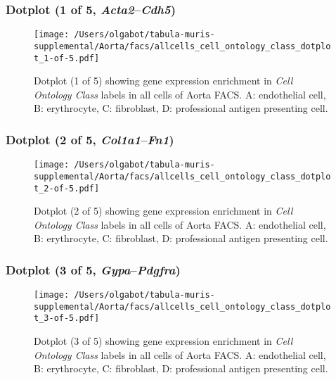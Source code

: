\clearpage

\subsubsection{Dotplot (1 of 5, \emph{Acta2}--\emph{Cdh5})}
\begin{figure}[h]
\centering
\texttt{[image: /Users/olgabot/tabula-muris-supplemental/Aorta/facs/allcells\_cell\_ontology\_class\_dotplot\_1-of-5.pdf]}

\caption{ Dotplot (1 of 5)  showing gene expression enrichment in \emph{Cell Ontology Class} labels in all cells of Aorta FACS. A: endothelial cell, B: erythrocyte, C: fibroblast, D: professional antigen presenting cell.}
\end{figure}


\clearpage

\subsubsection{Dotplot (2 of 5, \emph{Col1a1}--\emph{Fn1})}
\begin{figure}[h]
\centering
\texttt{[image: /Users/olgabot/tabula-muris-supplemental/Aorta/facs/allcells\_cell\_ontology\_class\_dotplot\_2-of-5.pdf]}

\caption{ Dotplot (2 of 5)  showing gene expression enrichment in \emph{Cell Ontology Class} labels in all cells of Aorta FACS. A: endothelial cell, B: erythrocyte, C: fibroblast, D: professional antigen presenting cell.}
\end{figure}


\clearpage

\subsubsection{Dotplot (3 of 5, \emph{Gypa}--\emph{Pdgfra})}
\begin{figure}[h]
\centering
\texttt{[image: /Users/olgabot/tabula-muris-supplemental/Aorta/facs/allcells\_cell\_ontology\_class\_dotplot\_3-of-5.pdf]}

\caption{ Dotplot (3 of 5)  showing gene expression enrichment in \emph{Cell Ontology Class} labels in all cells of Aorta FACS. A: endothelial cell, B: erythrocyte, C: fibroblast, D: professional antigen presenting cell.}
\end{figure}


\clearpage

